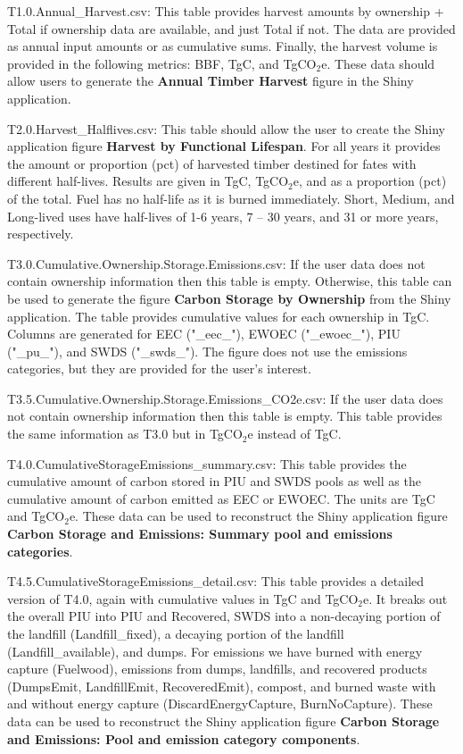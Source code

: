 \documentclass[
  openany]{book}
\begin{document}
T1.0.Annual\_Harvest.csv: This table provides harvest amounts by ownership + Total if ownership data are available, and just Total if not. The data are provided as annual input amounts or as cumulative sums. Finally, the harvest volume is provided in the following metrics: BBF, TgC, and TgCO\(_2\)e. These data should allow users to generate the \textbf{Annual Timber Harvest} figure in the Shiny application.

T2.0.Harvest\_Halflives.csv: This table should allow the user to create the Shiny application figure \textbf{Harvest by Functional Lifespan}. For all years it provides the amount or proportion (pct) of harvested timber destined for fates with different half-lives. Results are given in TgC, TgCO\(_2\)e, and as a proportion (pct) of the total. Fuel has no half-life as it is burned immediately. Short, Medium, and Long-lived uses have half-lives of 1-6 years, 7 -- 30 years, and 31 or more years, respectively.

T3.0.Cumulative.Ownership.Storage.Emissions.csv: If the user data does not contain ownership information then this table is empty. Otherwise, this table can be used to generate the figure \textbf{Carbon Storage by Ownership} from the Shiny application. The table provides cumulative values for each ownership in TgC. Columns are generated for EEC ("\_eec\_"), EWOEC ("\_ewoec\_"), PIU ("\_pu\_"), and SWDS ("\_swds\_"). The figure does not use the emissions categories, but they are provided for the user's interest.

T3.5.Cumulative.Ownership.Storage.Emissions\_CO2e.csv: If the user data does not contain ownership information then this table is empty. This table provides the same information as T3.0 but in TgCO\(_2\)e instead of TgC.

T4.0.CumulativeStorageEmissions\_summary.csv: This table provides the cumulative amount of carbon stored in PIU and SWDS pools as well as the cumulative amount of carbon emitted as EEC or EWOEC. The units are TgC and TgCO\(_2\)e. These data can be used to reconstruct the Shiny application figure \textbf{Carbon Storage and Emissions: Summary pool and emissions categories}.

T4.5.CumulativeStorageEmissions\_detail.csv: This table provides a detailed version of T4.0, again with cumulative values in TgC and TgCO\(_2\)e. It breaks out the overall PIU into PIU and Recovered, SWDS into a non-decaying portion of the landfill (Landfill\_fixed), a decaying portion of the landfill (Landfill\_available), and dumps. For emissions we have burned with energy capture (Fuelwood), emissions from dumps, landfills, and recovered products (DumpsEmit, LandfillEmit, RecoveredEmit), compost, and burned waste with and without energy capture (DiscardEnergyCapture, BurnNoCapture). These data can be used to reconstruct the Shiny application figure \textbf{Carbon Storage and Emissions: Pool and emission category components}.
\end{document}
